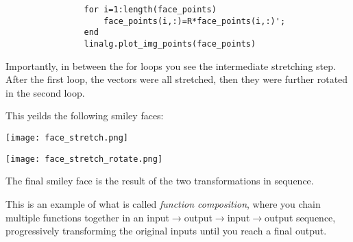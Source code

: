 \documentclass{ximera}
\begin{document}
\begin{exploration}
\begin{example}
\begin{verbatim}
                for i=1:length(face_points)
                    face_points(i,:)=R*face_points(i,:)';
                end
                linalg.plot_img_points(face_points)
        \end{verbatim}

        Importantly, in between the for loops you see the intermediate stretching step. After the first loop, the vectors were all stretched, then they were further rotated in the second loop.

        This yeilds the following smiley faces:


        \begin{center}
            \texttt{[image: face\_stretch.png]}
        \end{center}

        \begin{center}
            \texttt{[image: face\_stretch\_rotate.png]}
        \end{center}

        The final smiley face is the result of the two transformations in sequence.

        \begin{remark}

        This is an example of what is called \emph{function composition}, where you chain multiple functions together in an input$\rightarrow$output$\rightarrow$input$\rightarrow$output sequence, progressively transforming the original inputs until you reach a final output.

\end{remark}
\end{example}
\end{exploration}
\end{document}
